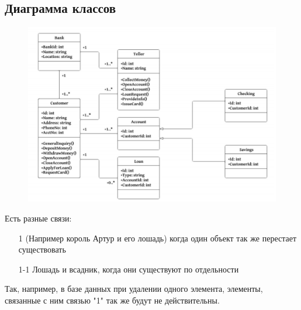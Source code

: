 \documentclass[12pt; a4paper]{book}
\begin{document}
\subsection{Диаграмма классов}
\begin{figure}[!hbp]
\includegraphics[angle=0, width=\textwidth]{IMG/2} \\
\end{figure}
Есть разные связи: 
\begin{enumerate}
\item[1] (Например король Артур и его лошадь) когда один объект так же перестает существовать
\item[1-1] Лошадь и всадник, когда они существуют по отдельности
\end{enumerate}
Так, например, в базе данных при удалении одного элемента, элементы, связанные с ним связью "1" так же будут не действительны.
\newpage
\end{document}
